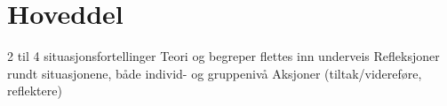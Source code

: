 \section{Hoveddel}
2 til 4 situasjonsfortellinger
Teori og begreper flettes inn underveis
Refleksjoner rundt situasjonene, både individ- og gruppenivå
Aksjoner (tiltak/videreføre, reflektere)
